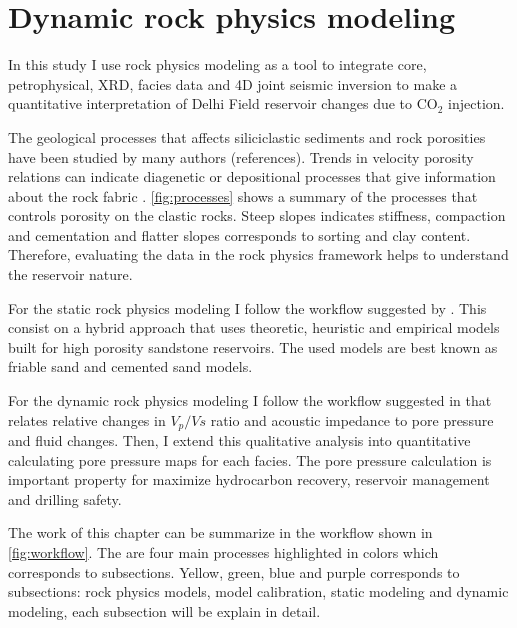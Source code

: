 \chapter{Dynamic rock physics modeling}

In this study I use rock physics modeling as a tool to integrate  core, petrophysical, 
XRD, facies data and 4D joint seismic inversion to make a quantitative
interpretation of Delhi Field reservoir changes due to CO$_2$ injection.

The geological processes that affects siliciclastic sediments and rock porosities have been 
studied by many authors (references). Trends in velocity 
porosity relations can indicate diagenetic or depositional processes that 
give information about the rock fabric \citep{ref:avseth}. \ref{fig:processes} shows 
a summary of the processes that controls porosity on the clastic rocks. Steep slopes
indicates stiffness, compaction and cementation and flatter slopes corresponds
to sorting and clay content. Therefore, evaluating the data in the rock physics framework
helps to understand the reservoir nature.
 

For the static rock physics modeling I follow the workflow suggested by \cite{ref:avseth}. This 
consist on a hybrid  approach that uses theoretic, heuristic and empirical
models built for high porosity sandstone reservoirs. The used models are best known as friable
sand and cemented sand models. 

For the dynamic rock physics modeling I follow the workflow suggested in \cite{ref:dynamic} that
relates relative changes in $V_{p}/V{s}$ ratio and acoustic impedance to pore pressure
and fluid changes. Then, I extend this qualitative analysis into quantitative calculating
pore pressure maps for each facies. The pore pressure calculation is important property for maximize
hydrocarbon recovery, reservoir management and drilling safety.

The work of this chapter can be summarize in the workflow shown in \ref{fig:workflow}.
The are four main processes highlighted in colors which corresponds to subsections. Yellow,
green, blue and purple corresponds to subsections: rock physics models, model calibration,
static modeling and dynamic modeling, each subsection will be explain in detail.

